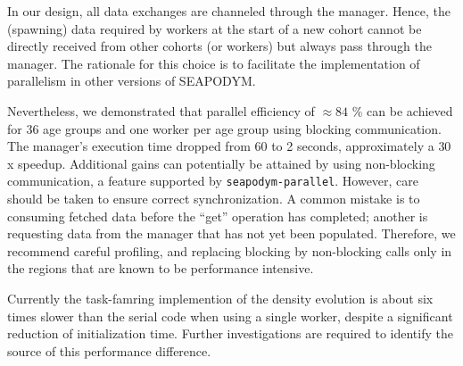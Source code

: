 \documentclass[a4paper,oneside,12pt]{article}
\begin{document}
In our design, all data exchanges are channeled through the manager. 
Hence, the (spawning) data required by workers at the start of a new cohort cannot be directly received from other 
cohorts (or workers) but always pass through the manager. The rationale for this choice is to facilitate the implementation of parallelism
in other versions of SEAPODYM.

Nevertheless, we demonstrated that parallel efficiency of $\approx 84$ \% can be achieved for 36 age groups and one worker per age group using blocking communication. 
The manager's execution time dropped from 60 to 2 seconds, approximately a $30$x speedup. Additional gains can potentially
be attained by using non-blocking communication, a feature supported by \verb|seapodym-parallel|. However, care should be taken to ensure 
correct synchronization. A common mistake is to consuming fetched data before the ``get'' operation has completed; another
is requesting data from the manager that has not yet been populated. Therefore, we recommend careful profiling, and replacing blocking by
non-blocking calls only in the regions that are known to be performance intensive.

Currently the task-famring implemention of the density evolution is about six times slower than 
the serial code when using a single worker, despite a significant reduction of initialization
time. Further investigations are required to identify the source of this performance difference.
\end{document}
